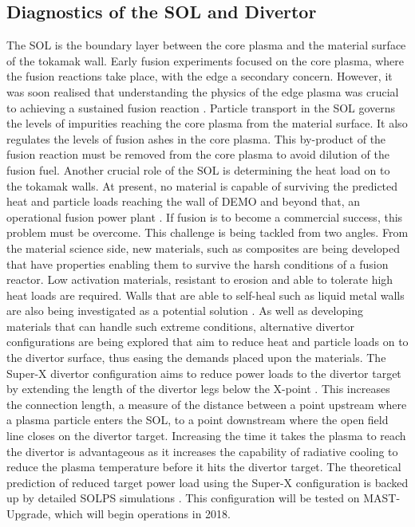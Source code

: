 	\subsection{Diagnostics of the SOL and Divertor} 
	The SOL is the boundary layer between the core plasma and the material surface of the tokamak wall. Early fusion experiments focused on the core plasma, where the fusion reactions take place, with the edge a secondary concern. However, it was soon realised that understanding the physics of the edge plasma was crucial to achieving a sustained fusion reaction \cite{edge_importance}. Particle transport in the SOL governs the levels of impurities reaching the core plasma from the material surface. It also regulates the levels of fusion ashes in the core plasma. This by-product of the fusion reaction must be removed from the core plasma to avoid dilution of the fusion fuel. Another crucial role of the SOL is determining the heat load on to the tokamak walls. At present, no material is capable of surviving the predicted heat and particle loads reaching the wall of DEMO and beyond that, an operational fusion power plant \cite{DEMO_material}. If fusion is to become a commercial success, this problem must be overcome. This challenge is being tackled from two angles. From the material science side, new materials, such as composites are being developed that have properties enabling them to survive the harsh conditions of a fusion reactor. Low activation materials, resistant to erosion and able to tolerate high heat loads are required. Walls that are able to self-heal such as liquid metal walls are also being investigated as a potential solution \cite{DEMO_material}. As well as developing materials that can handle such extreme conditions, alternative divertor configurations are being explored that aim to reduce heat and particle loads on to the divertor surface, thus easing the demands placed upon the materials. The Super-X divertor configuration aims to reduce power loads to the divertor target by extending the length of the divertor legs below the X-point \cite{GEOFF}. This increases the connection length, a measure of the distance between a point upstream where a plasma particle enters the SOL, to a point downstream where the open field line closes on the divertor target. Increasing the time it takes the plasma to reach the divertor is advantageous as it increases the capability of radiative cooling to reduce the plasma temperature before it hits the divertor target. The theoretical prediction of reduced  target power load using the Super-X configuration is backed up by detailed SOLPS simulations \cite{SOLPS}. This configuration will be tested on MAST-Upgrade, which will begin operations in 2018.
	
